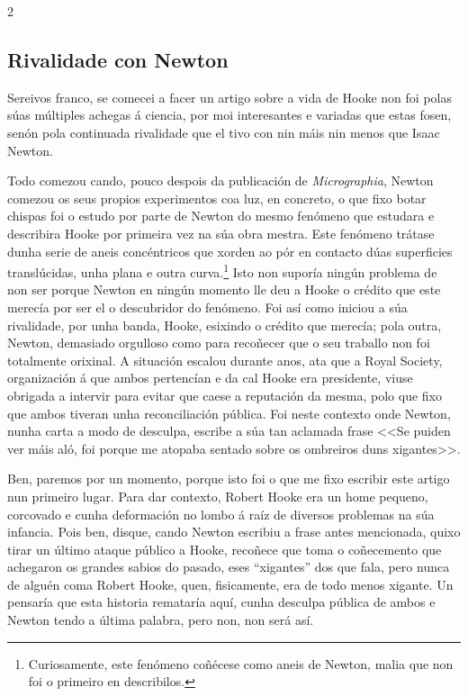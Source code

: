 \begin{multicols}{2}
\subsection*{Rivalidade con Newton}

Sereivos franco, se comecei a facer un artigo sobre a vida de Hooke non foi
polas súas múltiples achegas á ciencia, por moi interesantes e variadas que
estas fosen, senón pola continuada rivalidade que el tivo con nin máis nin
menos que Isaac Newton.

Todo comezou cando, pouco despois da publicación de \textit{Micrographia},
Newton comezou os seus propios experimentos coa luz, en concreto, o que fixo
botar chispas foi o estudo por parte de Newton do mesmo fenómeno que estudara e
describira Hooke por primeira vez na súa obra mestra. Este fenómeno trátase
dunha serie de aneis concéntricos que xorden ao pór en contacto dúas
superficies translúcidas, unha plana e outra curva.\footnote{Curiosamente, este
fenómeno coñécese como aneis de Newton, malia que non foi o primeiro en
describilos.} Isto non suporía ningún problema de non ser porque Newton
en ningún momento lle deu a Hooke o crédito que este merecía por ser el o
descubridor do fenómeno. Foi así como iniciou a súa rivalidade, por unha banda,
Hooke, esixindo o crédito que merecía; pola outra, Newton, demasiado orgulloso
como para recoñecer que o seu traballo non foi totalmente orixinal. A situación
escalou durante anos, ata que a Royal Society, organización á que ambos
pertencían e da cal Hooke era presidente, viuse obrigada a intervir para evitar
que caese a reputación da mesma, polo que fixo que ambos tiveran unha
reconciliación pública. Foi neste contexto onde Newton, nunha carta a modo de
desculpa, escribe a súa tan aclamada frase <<Se puiden ver máis aló, foi porque
me atopaba sentado sobre os ombreiros duns xigantes>>.

Ben, paremos por un momento, porque isto foi o que me fixo escribir este artigo
nun primeiro lugar. Para dar contexto, Robert Hooke era un home pequeno,
corcovado e cunha deformación no lombo á raíz de diversos problemas na súa
infancia. Pois ben, disque, cando Newton escribiu a frase antes mencionada,
quixo tirar un último ataque público a Hooke, recoñece que toma o coñecemento
que achegaron os grandes sabios do pasado, eses ``xigantes'' dos que fala, pero
nunca de alguén coma Robert Hooke, quen, fisicamente, era de todo menos
xigante. Un pensaría que esta historia remataría aquí, cunha desculpa pública
de ambos e Newton tendo a última palabra, pero non, non será así.


\end{multicols}
